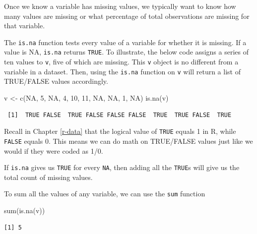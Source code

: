 \documentclass[
]{book}
\makeatletter
\newenvironment{Shaded}{\begin{snugshade}}{\end{snugshade}}
\newcommand{\ConstantTok}[1]{\textcolor[rgb]{0,0,0}{#1}}
\newcommand{\DecValTok}[1]{\textcolor[rgb]{0.06,0.06,0.06}{#1}}
\newcommand{\FunctionTok}[1]{\textcolor[rgb]{0,0,0}{#1}}
\newcommand{\NormalTok}[1]{#1}
\newcommand{\OtherTok}[1]{\textcolor[rgb]{0.37,0.37,0.37}{#1}}
\newenvironment{kframe}{%
\medskip{}
\setlength{\fboxsep}{.8em}
 \def\at@end@of@kframe{}%
 \ifinner\ifhmode%
  \def\at@end@of@kframe{\end{minipage}}%
  \begin{minipage}{\columnwidth}%
 \fi\fi%
 \def\FrameCommand##1{\hskip\@totalleftmargin \hskip-\fboxsep
 \colorbox{shadecolor}{##1}\hskip-\fboxsep
     \hskip-\linewidth \hskip-\@totalleftmargin \hskip\columnwidth}%
 \MakeFramed {\advance\hsize-\width
   \@totalleftmargin\z@ \linewidth\hsize
   \@setminipage}}%
 {\par\unskip\endMakeFramed%
 \at@end@of@kframe}
\renewenvironment{Shaded}{\begin{kframe}}{\end{kframe}}
\makeatother
\begin{document}
Once we know a variable has missing values, we typically want to know how many values are missing or what percentage of total observations are missing for that variable.

The \texttt{is.na} function tests every value of a variable for whether it is missing. If a value is NA, \texttt{is.na} returns \texttt{TRUE}. To illustrate, the below code assigns a series of ten values to \texttt{v}, five of which are missing. This \texttt{v} object is no different from a variable in a dataset. Then, using the \texttt{is.na} function on \texttt{v} will return a list of TRUE/FALSE values accordingly.

\begin{Shaded}
\begin{Highlighting}[]
\NormalTok{v }\OtherTok{\textless{}{-}} \FunctionTok{c}\NormalTok{(}\ConstantTok{NA}\NormalTok{, }\DecValTok{5}\NormalTok{, }\ConstantTok{NA}\NormalTok{, }\DecValTok{4}\NormalTok{, }\DecValTok{10}\NormalTok{, }\DecValTok{11}\NormalTok{, }\ConstantTok{NA}\NormalTok{, }\ConstantTok{NA}\NormalTok{, }\DecValTok{1}\NormalTok{, }\ConstantTok{NA}\NormalTok{)}
\FunctionTok{is.na}\NormalTok{(v)}
\end{Highlighting}
\end{Shaded}

\begin{verbatim}
 [1]  TRUE FALSE  TRUE FALSE FALSE FALSE  TRUE  TRUE FALSE  TRUE
\end{verbatim}

Recall in Chapter \ref{r-data} that the logical value of \texttt{TRUE} equals 1 in R, while \texttt{FALSE} equals 0. This means we can do math on TRUE/FALSE values just like we would if they were coded as 1/0.

If \texttt{is.na} gives us \texttt{TRUE} for every \texttt{NA}, then adding all the \texttt{TRUE}s will give us the total count of missing values.

To sum all the values of any variable, we can use the \texttt{sum} function

\begin{Shaded}
\begin{Highlighting}[]
\FunctionTok{sum}\NormalTok{(}\FunctionTok{is.na}\NormalTok{(v))}
\end{Highlighting}
\end{Shaded}

\begin{verbatim}
[1] 5
\end{verbatim}
\end{document}
